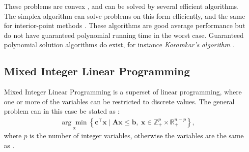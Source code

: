 These problems are convex \cite{wolsey2020integer}, and can be solved by several efficient algorithms. The simplex algorithm can solve problems on this form efficiently, and the same for interior-point methods \cite{nocedal2006numerical}. These algorithms are good average performance but do not have guaranteed polynomial running time in the worst case. Guaranteed polynomial solution algorithms do exist, for instance \textit{Karamkar's algorithm} \cite{karamkar1984new}. 


\subsection{Mixed Integer Linear Programming}

Mixed Integer Linear Programming is a superset of linear programming, where one or more of the variables can be restricted to discrete values. The general problem can in this case be stated as \cite{gasse2019exact}:
\begin{align}\label{eq:milp}
    \underset{\mathbf{x}}{\arg \min }\left\{\mathbf{c}^{\top} \mathbf{x} \mid \mathbf{A} \mathbf{x} \leq \mathbf{b}, \; \mathbf{x} \in \mathbb{Z}_+^{p} \times \mathbb{R}_+^{n-p}\right\},
\end{align}
where $ p $ is the number of integer variables, otherwise the variables are the same as .

